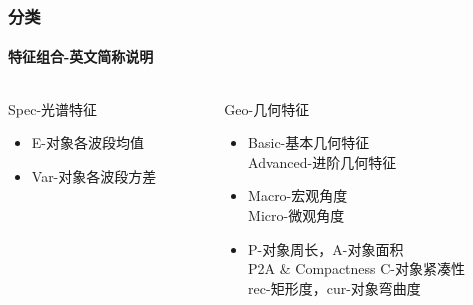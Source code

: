 \documentclass[10pt]{beamer}
\begin{document}
\begin{frame}
	\frametitle{分类}
	\framesubtitle{特征组合-英文简称说明}
	\begin{columns}
		\begin{column}{0.4\textwidth}
		\begin{block}{Spec-光谱特征}
		\begin{itemize}
			\small
			\item E-对象各波段均值
			\\[2ex]
			\item Var-对象各波段方差
		\end{itemize}
		\end{block}
		\end{column}
		\begin{column}{0.5\textwidth}
		\begin{block}{Geo-几何特征}
		\begin{itemize}
			\small
			\item Basic-基本几何特征
			\\[2ex]
			Advanced-进阶几何特征
			\\[2ex]
			\item Macro-宏观角度
			\\[2ex]
			Micro-微观角度
			\\[2ex]
			\item P-对象周长，A-对象面积
			\\[2ex]
			P2A \& Compactness C-对象紧凑性
			\\[2ex]
			rec-矩形度，cur-对象弯曲度
		\end{itemize}
		\end{block}
		\end{column}
	\end{columns}
\end{frame}
\end{document}
